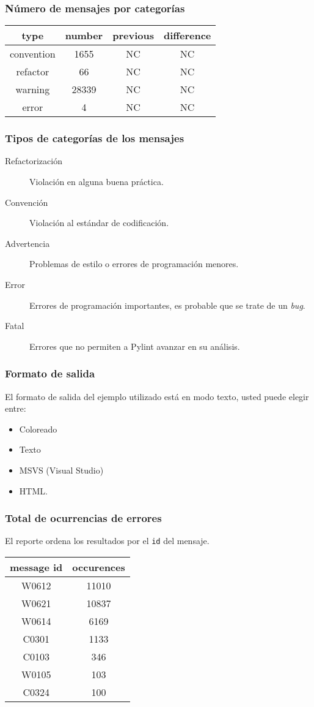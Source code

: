 \documentclass{beamer}
\begin{document}
\begin{frame}
\frametitle{Número de mensajes por categorías}

\begin{tabular}{|c|c|c|c|}
\hline
type & number & previous & difference \\
\hline
\hline
convention & 1655 & NC & NC \\
\hline
refactor & 66 & NC & NC \\
\hline
warning & 28339 & NC & NC \\
\hline
error & 4 & NC & NC \\
\hline
\end{tabular}
\end{frame}


\begin{frame}
\frametitle{Tipos de categorías de los mensajes}
\begin{description}
\item[Refactorización] Violación en alguna buena práctica.
\item[Convención] Violación al estándar de codificación.
\item[Advertencia] Problemas de estilo o errores de programación menores.
\item[Error] Errores de programación importantes, es probable que se trate de un \emph{bug}.
\item[Fatal] Errores que no permiten a Pylint avanzar en su análisis. 
\end{description}

\end{frame}

\begin{frame}
\frametitle{Formato de salida}

El formato de salida del ejemplo utilizado está en modo texto, usted puede elegir entre: 

\begin{itemize}
    \item Coloreado
    \item Texto
    \item MSVS (Visual Studio)
    \item HTML.
\end{itemize}

\end{frame}

\begin{frame}
\frametitle{Total de ocurrencias de errores}
El reporte ordena los resultados por el \texttt{id} del mensaje.
\begin{tabular}{|c|c|}
\hline
message id & occurences \\
\hline
\hline
W0612      &11010      \\
\hline
W0621      &10837      \\
\hline
W0614      &6169       \\
\hline
C0301      &1133       \\
\hline
C0103      &346        \\
\hline
W0105      &103        \\
\hline
C0324      &100        \\
\hline
\end{tabular}
\end{frame}
\end{document}

